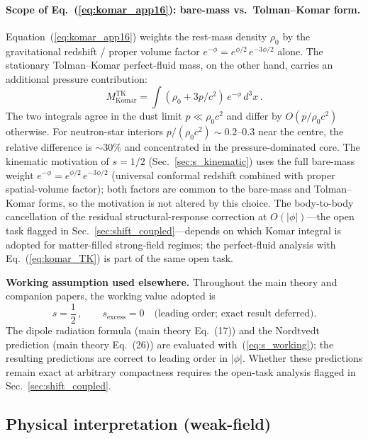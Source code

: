 \documentclass[11pt]{article}
\begin{document}
\paragraph{Scope of Eq.~(\ref{eq:komar_app16}):
bare-mass vs.\ Tolman--Komar form.}
Equation~(\ref{eq:komar_app16}) weights the rest-mass
density $\rho_0$ by the gravitational redshift / proper
volume factor $e^{-\phi} = e^{\phi/2}\,e^{-3\phi/2}$
alone.  The stationary Tolman--Komar perfect-fluid mass,
on the other hand, carries an additional pressure
contribution:
\begin{equation}\label{eq:komar_TK}
  M_{\mathrm{Komar}}^{\mathrm{TK}} =
  \int (\rho_0 + 3p/c^2)\,e^{-\phi}\,d^3x\,.
\end{equation}
The two integrals agree in the dust limit $p\ll\rho_0
c^2$ and differ by $O(p/\rho_0 c^2)$ otherwise.  For
neutron-star interiors $p/(\rho_0 c^2)\sim 0.2$--$0.3$
near the centre, the relative difference is $\sim 30\%$
and concentrated in the pressure-dominated core.  The
kinematic motivation of $s=1/2$ (Sec.~\ref{sec:s_kinematic})
uses the full bare-mass weight $e^{-\phi}=e^{\phi/2}\,e^{-3\phi/2}$
(universal conformal redshift combined with proper
spatial-volume factor); both factors are common to the
bare-mass and Tolman--Komar forms, so the motivation is
not altered by this choice.  The body-to-body cancellation of the
residual structural-response correction at
$O(|\phi|)$---the open task flagged in
Sec.~\ref{sec:shift_coupled}---depends on which Komar
integral is adopted for matter-filled strong-field
regimes; the perfect-fluid analysis with
Eq.~(\ref{eq:komar_TK}) is part of the same open task.

\textbf{Working assumption used elsewhere.}  Throughout
the main theory and companion papers, the working value
adopted is
\begin{equation}\label{eq:s_working}
  s = \frac{1}{2}\,,\qquad
  s_{\mathrm{excess}} = 0 \quad
  \text{(leading order; exact result deferred)}.
\end{equation}
The dipole radiation formula (main theory Eq.~(17)) and
the Nordtvedt prediction (main theory Eq.~(26)) are
evaluated with~(\ref{eq:s_working}); the resulting
predictions are correct to leading order in $|\phi|$.
Whether these predictions remain exact at arbitrary
compactness requires the open-task analysis flagged in
Sec.~\ref{sec:shift_coupled}.

\subsection{Physical interpretation (weak-field)}
\end{document}
